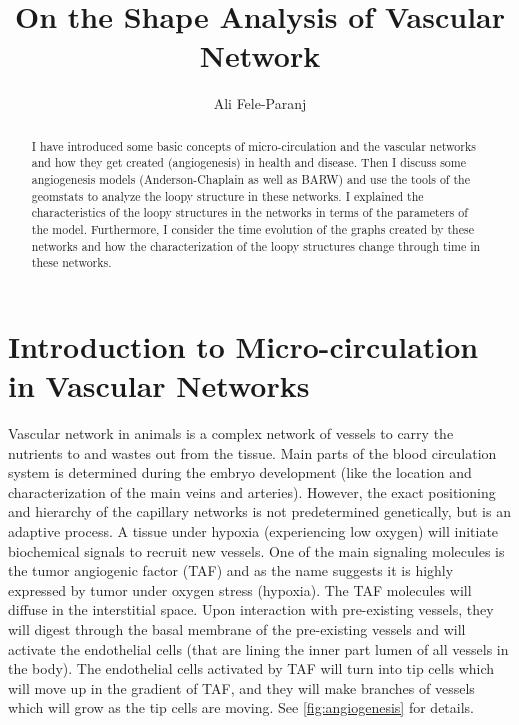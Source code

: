 \documentclass[10pt,a4paper,twocolumn]{article}
\title{On the Shape Analysis of Vascular Network}
\author{Ali Fele-Paranj}
\begin{document}
	\maketitle
	\begin{abstract}
		I have introduced some basic concepts of micro-circulation and the vascular networks and how they get created (angiogenesis) in health and disease. Then I discuss some angiogenesis models (Anderson-Chaplain as well as BARW) and use the tools of the geomstats to analyze the loopy structure in these networks. I explained the characteristics of the loopy structures in the networks in terms of the parameters of the model. Furthermore, I consider the time evolution of the graphs created by these networks and how the characterization of the loopy structures change through time in these networks. 
	\end{abstract}
	
	\section{Introduction to Micro-circulation in Vascular Networks}
	Vascular network in animals is a complex network of vessels to carry the nutrients to and wastes out from the tissue. Main parts of the blood circulation system is determined during the embryo development (like the location and characterization of the main veins and arteries). However, the exact positioning and hierarchy of the capillary networks is not predetermined genetically, but is an adaptive process. A tissue under hypoxia (experiencing low oxygen) will initiate biochemical signals to recruit new vessels. One of the main signaling molecules is the tumor angiogenic factor (TAF) and as the name suggests it is highly expressed by tumor under oxygen stress (hypoxia). The TAF molecules will diffuse in the interstitial space. Upon interaction with pre-existing vessels, they will digest through the basal membrane of the pre-existing vessels and will activate the endothelial cells (that are lining the inner part lumen of all vessels in the body). The endothelial cells activated by TAF will turn into tip cells which will move up in the gradient of TAF, and they will make branches of vessels which will grow as the tip cells are moving. See \autoref{fig:angiogenesis} for details.
\end{document}
